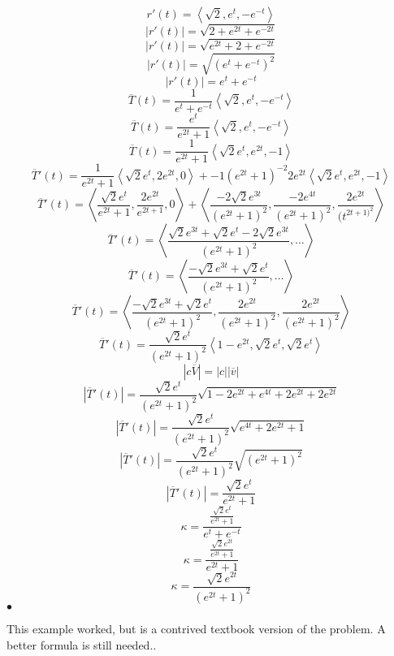 	\begin{solution}[Curvature]
		\[r'(t) = \left<\sqrt{2} , e^{t}, -e^{-t} \right>\]
		\[\left|  r'(t) \right| = \sqrt{2 + e^{2t} + e^{-2t}} \]
		\[\left|  r'(t) \right| = \sqrt{e^{2t} + 2 + e^{-2t}} \]
		\[\left|  r'(t) \right| = \sqrt{(e^{t} + e^{-t})^2} \]
		\[\left|  r'(t) \right| = e^{t} + e^{-t} \]
		\[\overline{T}(t) = \frac{1}{e^{t} + e^{-t}}\left<\sqrt{2} , e^{t}, -e^{-t} \right>\]
		\[\overline{T}(t) = \frac{e^{t}}{e^{2t} + 1}\left<\sqrt{2} , e^{t}, -e^{-t} \right>\]
		\[\overline{T}(t) = \frac{1}{e^{2t} + 1}\left<\sqrt{2}e^{t} , e^{2t}, -1 \right>\]
		\[\overline{T}'(t) = \frac{1}{e^{2t}+1}\left<\sqrt{2} e^{t}, 2e^{2t}, 0 \right> +
		-1(e^{2t}+1)^{-2}2e^{2t}\left<\sqrt{2} e^{t},e^{2t}, -1 \right>\]
		\[\overline{T}'(t) = \left< \frac{\sqrt{2} e^{t}}{e^{2t}+1}, \frac{2e^{2t}}{e^{2t+1}}, 0 \right> +
		\left<\frac{-2\sqrt{2} e^{3t}}{(e^{2t}+1)^2}, \frac{-2e^{4t}}{(e^{2t}+1)^2}, \frac{2e^{2t}}{(t^{2t + 1)^2}}\right>\]
		\[\overline{T}'(t) = \left< \frac{\sqrt{2} e^{3t} + \sqrt{2} e^{t }- 2\sqrt{2} e^{3t}}{(e^{2t} +1)^2} , \ldots\right>\]
		\[\overline{T}'(t) = \left< \frac{-\sqrt{2} e^{3t} + \sqrt{2} e^{t}}{(e^{2t} +1)^2} , \ldots\right>\]
		\[\overline{T}'(t) = \left< \frac{-\sqrt{2} e^{3t} + \sqrt{2} e^{t}}{(e^{2t} +1)^2} , \frac{2e^{2t}}{(e^{2t}+1)^2}, \frac{2e^{2t}}{(e^{2t}+1)^2}\right>\]
		\[\overline{T}'(t)  = \frac{\sqrt{2} e^{t}}{(e^{2t}+1)^2}\left<1-e^{2t}, \sqrt{2} e^{t}, \sqrt{2} e^{t} \right>\]
		\[\left| c \overline{V} \right| = \left| c \right| \left| \overline{v} \right|  \]
		\[\left|   \overline{T}'(t)\right|  = \frac{\sqrt{2} e^{t}}{(e^{2t}+1)^2}\sqrt{1 - 2e^{2t} + e^{4t} + 2e^{2t} + 2e^{2t}} \]
		\[\left|   \overline{T}'(t)\right|  = \frac{\sqrt{2} e^{t}}{(e^{2t}+1)^2}\sqrt{e^{4t}+2e^{2t}+1} \]
		\[\left|   \overline{T}'(t)\right|  = \frac{\sqrt{2} e^{t}}{(e^{2t}+1)^2}\sqrt{(e^{2t}+1)^2} \]
		\[\left|   \overline{T}'(t)\right|  = \frac{\sqrt{2} e^{t}}{e^{2t}+1} \]
		\[\kappa = \frac{\frac{\sqrt{2} e^{t}}{e^{2t}+1}}{e^{t}+e^{-t}}\]
		\[\kappa = \frac{\frac{\sqrt{2} e^{2t}}{e^{2t}+1}}{e^{2t}+1}\]
	\[\kappa = \frac{\sqrt{2} e^{2t}}{(e^{2t}+1)^2}\]
	\smallskip\hfill$\bullet$\end{solution}

	This example worked, but is a contrived textbook version of the problem. A better formula is still needed..


\newpage


